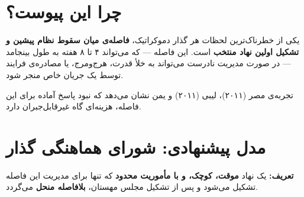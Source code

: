 \documentclass[12pt,a4paper,twoside,openany]{book}
\begin{document}
	\section*{چرا این پیوست؟}
	
	یکی از خطرناک‌ترین لحظات هر گذار دموکراتیک، \textbf{فاصله‌ی میان سقوط نظام پیشین
		و تشکیل اولین نهاد منتخب} است. این فاصله --- که می‌تواند ۴ تا ۸ هفته به طول
	بینجامد --- در صورت مدیریت نادرست می‌تواند به خلأ قدرت، هرج‌ومرج، یا مصادره‌ی
	فرایند توسط یک جریان خاص منجر شود.
	
	تجربه‌ی مصر (۲۰۱۱)، لیبی (۲۰۱۱) و یمن نشان می‌دهد که نبود پاسخ آماده برای این
	فاصله، هزینه‌ای گاه غیرقابل‌جبران دارد.
	
	\section{مدل پیشنهادی: شورای هماهنگی گذار}
	
	\begin{dangerbox}
		\textbf{تعریف:} یک نهاد \textbf{موقت، کوچک، و با مأموریت محدود} که تنها برای مدیریت
		این فاصله تشکیل می‌شود و پس از تشکیل مجلس مهستان، \textbf{بلافاصله منحل} می‌گردد.
	\end{dangerbox}
	
\end{document}
